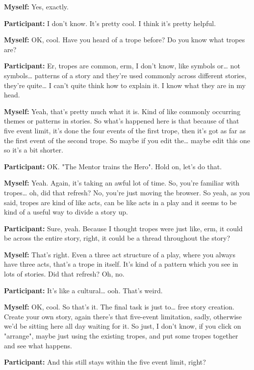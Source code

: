 \documentclass[11pt]{report}
\begin{document}
\begin{linenumbers}
\textbf{Myself:} Yes, exactly.

\textbf{Participant:} I don't know. It's pretty cool. I think it's pretty helpful.

\textbf{Myself:} OK, cool. Have you heard of a trope before? Do you know what tropes are?

\textbf{Participant:} Er, tropes are common, erm, I don't know, like symbols or\ldots{} not symbols\ldots{} patterns of a story and they're used commonly across different stories, they're quite\ldots{} I can't quite think how to explain it. I know what they are in my head.

\textbf{Myself:} Yeah, that's pretty much what it is. Kind of like commonly occurring themes or patterns in stories. So what's happened here is that because of that five event limit, it's done the four events of the first trope, then it's got as far as the first event of the second trope. So maybe if you edit the\ldots{} maybe edit this one so it's a bit shorter.

\textbf{Participant:} OK. "The Mentor trains the Hero". Hold on, let's do that.

\textbf{Myself:} Yeah. Again, it's taking an awful lot of time. So, you're familiar with tropes\ldots{} oh, did that refresh? No, you're just moving the browser. So yeah, as you said, tropes are kind of like acts, can be like acts in a play and it seems to be kind of a useful way to divide a story up.

\textbf{Participant:} Sure, yeah. Because I thought tropes were just like, erm, it could be across the entire story, right, it could be a thread throughout the story?

\textbf{Myself:} That's right. Even a three act structure of a play, where you always have three acts, that's a trope in itself. It's kind of a pattern which you see in lots of stories. Did that refresh? Oh, no.

\textbf{Participant:} It's like a cultural\ldots{} ooh. That's weird.

\textbf{Myself:} OK, cool. So that's it. The final task is just to\ldots{} free story creation. Create your own story, again there's that five-event limitation, sadly, otherwise we'd be sitting here all day waiting for it. So just, I don't know, if you click on "arrange", maybe just using the existing tropes, and put some tropes together and see what happens.

\textbf{Participant:} And this still stays within the five event limit, right?


\end{linenumbers}
\end{document}
